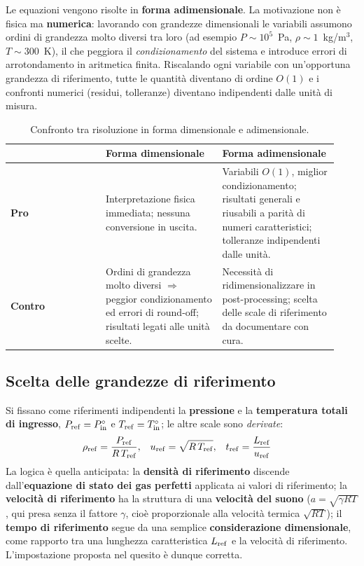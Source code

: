 Le equazioni vengono risolte in \textbf{forma adimensionale}.
La motivazione non è fisica ma \textbf{numerica}: lavorando con grandezze dimensionali
le variabili assumono ordini di grandezza molto diversi tra loro (ad esempio
$P \sim 10^5$~Pa, $\rho \sim 1$~kg/m$^3$, $T \sim 300$~K), il che peggiora il
\emph{condizionamento} del sistema e introduce errori di arrotondamento in aritmetica
finita. Riscalando ogni variabile con un'opportuna grandezza di riferimento, tutte le
quantità diventano di ordine $O(1)$ e i confronti numerici (residui, tolleranze)
diventano indipendenti dalle unità di misura.

\begin{table}[H]
\centering
\caption{Confronto tra risoluzione in forma dimensionale e adimensionale.}
\begin{tabular}{p{0.27\linewidth} p{0.33\linewidth} p{0.33\linewidth}}
\toprule
 & \textbf{Forma dimensionale} & \textbf{Forma adimensionale} \\
\midrule
\textbf{Pro} &
Interpretazione fisica immediata; nessuna conversione in uscita. &
Variabili $O(1)$, miglior condizionamento; risultati generali e riusabili a parità di
numeri caratteristici; tolleranze indipendenti dalle unità. \\[2pt]
\textbf{Contro} &
Ordini di grandezza molto diversi $\Rightarrow$ peggior condizionamento ed errori di
round-off; risultati legati alle unità scelte. &
Necessità di ridimensionalizzare in post-processing; scelta delle scale di
riferimento da documentare con cura. \\
\bottomrule
\end{tabular}
\end{table}

\subsection{Scelta delle grandezze di riferimento}

Si fissano come riferimenti indipendenti la \textbf{pressione} e la
\textbf{temperatura totali di ingresso}, $P_{\rm ref} = P^\circ_{\rm in}$ e
$T_{\rm ref} = T^\circ_{\rm in}$; le altre scale sono \emph{derivate}:
\begin{align*}
  \rho_{\rm ref} &= \frac{P_{\rm ref}}{R\,T_{\rm ref}}, &
  u_{\rm ref}    &= \sqrt{R\,T_{\rm ref}}, &
  t_{\rm ref}    &= \frac{L_{\rm ref}}{u_{\rm ref}}
\end{align*}
La logica è quella anticipata: la \textbf{densità di riferimento} discende
dall'\textbf{equazione di stato dei gas perfetti} applicata ai valori di riferimento;
la \textbf{velocità di riferimento} ha la struttura di una \textbf{velocità del suono}
($a = \sqrt{\gamma R T}$, qui presa senza il fattore $\gamma$, cioè proporzionale alla
velocità termica $\sqrt{RT}$); il \textbf{tempo di riferimento} segue da una semplice
\textbf{considerazione dimensionale}, come rapporto tra una lunghezza caratteristica
$L_{\rm ref}$ e la velocità di riferimento. L'impostazione proposta nel quesito è
dunque corretta.

